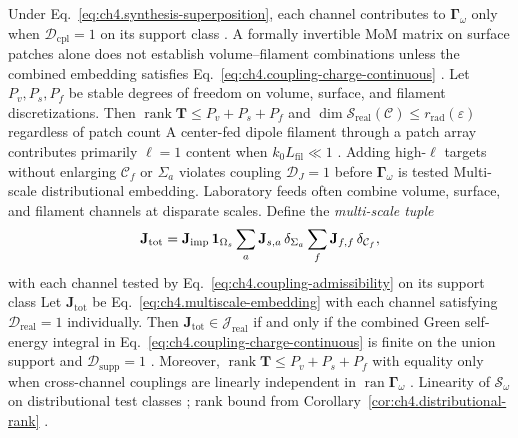 Under Eq.~\eqref{eq:ch4.synthesis-superposition}, each channel contributes to \(\boldsymbol{\Gamma}_\omega\) only when
\(\mathcal{D}_{\mathrm{cpl}}=1\) on its support class . A formally invertible MoM
matrix on surface patches alone does not establish volume--filament combinations unless the combined embedding satisfies
Eq.~\eqref{eq:ch4.coupling-charge-continuous} .
\label{cor:ch4.distributional-rank}
Let \(P_{v},P_{s},P_{f}\) be stable degrees of freedom on volume, surface, and filament discretizations. Then
\(\operatorname{rank}\mathbf{T}\le P_{v}+P_{s}+P_{f}\) and
\(\dim\mathcal{S}_{\mathrm{real}}(\mathcal{C})\le r_{\mathrm{rad}}(\varepsilon)\) regardless of patch count
A center-fed dipole filament through a patch array contributes primarily \(\ell=1\) content when
\(k_{0}L_{\mathrm{fil}}\ll1\) . Adding high-\(\ell\) targets without enlarging
\(\mathcal{C}_{f}\) or \(\Sigma_{a}\) violates coupling $\mathcal{D}_J=1$ before \(\boldsymbol{\Gamma}_\omega\) is tested
Multi-scale distributional embedding. Laboratory feeds often combine volume, surface, and filament channels at disparate scales. Define the
\emph{multi-scale tuple}
\begin{equation}
\label{eq:ch4.multiscale-embedding}
\mathbf{J}_{\mathrm{tot}}
=
\mathbf{J}_{\mathrm{imp}}\,\mathbf{1}_{\Omega_{s}}
\sum_{a}\mathbf{J}_{s,a}\,\delta_{\Sigma_{a}}
\sum_{f}\mathbf{J}_{f,f}\,\delta_{\mathcal{C}_{f}},
\end{equation}
with each channel tested by Eq.~\eqref{eq:ch4.coupling-admissibility} on its support class
\label{prop:ch4.multiscale-realizability}
Let \(\mathbf{J}_{\mathrm{tot}}\) be Eq.~\eqref{eq:ch4.multiscale-embedding} with each channel satisfying
\(\mathcal{D}_{\mathrm{real}}=1\) individually. Then \(\mathbf{J}_{\mathrm{tot}}\in\mathcal{J}_{\mathrm{real}}\) if and
only if the combined Green self-energy integral in Eq.~\eqref{eq:ch4.coupling-charge-continuous} is finite on the union
support and \(\mathcal{D}_{\mathrm{supp}}=1\) . Moreover,
\(\operatorname{rank}\mathbf{T}\le P_{v}+P_{s}+P_{f}\) with equality only when cross-channel couplings are linearly
independent in \(\operatorname{ran}\boldsymbol{\Gamma}_\omega\) .
Linearity of \(\mathcal{S}_\omega\) on distributional test classes ; rank bound from
Corollary~\ref{cor:ch4.distributional-rank} .
